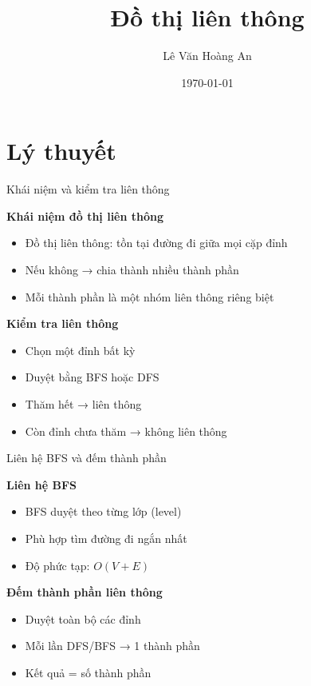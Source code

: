\documentclass{beamer}
\title{Đồ thị liên thông}
\author{Lê Văn Hoàng An}
\date{\today}
\begin{document}
\frame{\titlepage}

\section{Lý thuyết}

\begin{frame}{Khái niệm và kiểm tra liên thông}
\begin{tcolorbox}
\textbf{\faProjectDiagram Khái niệm đồ thị liên thông}
\begin{itemize}
\item \faCircle Đồ thị liên thông: tồn tại đường đi giữa mọi cặp đỉnh
\item \faTimesCircle Nếu không → chia thành nhiều thành phần
\item \faSitemap Mỗi thành phần là một nhóm liên thông riêng biệt
\end{itemize}
\end{tcolorbox}

\vspace{0.3cm}

\begin{tcolorbox}
\textbf{\faSearch Kiểm tra liên thông}
\begin{itemize}
\item \faPlay Chọn một đỉnh bất kỳ
\item \faRoute Duyệt bằng BFS hoặc DFS
\item \faCheckCircle Thăm hết → liên thông
\item \faExclamationTriangle Còn đỉnh chưa thăm → không liên thông
\end{itemize}
\end{tcolorbox}
\end{frame}

\begin{frame}{Liên hệ BFS và đếm thành phần}
\begin{tcolorbox}
\textbf{\faLayerGroup Liên hệ BFS}
\begin{itemize}
\item \faStream BFS duyệt theo từng lớp (level)
\item \faBolt Phù hợp tìm đường đi ngắn nhất
\item \faClock Độ phức tạp: $O(V + E)$
\end{itemize}
\end{tcolorbox}

\vspace{0.3cm}

\begin{tcolorbox}
\textbf{\faCogs Đếm thành phần liên thông}
\begin{itemize}
\item \faSearch Duyệt toàn bộ các đỉnh
\item \faPlusCircle Mỗi lần DFS/BFS → 1 thành phần
\item \faSortNumericUp Kết quả = số thành phần
\end{itemize}
\end{tcolorbox}
\end{frame}
\end{document}
